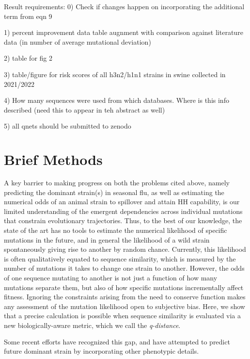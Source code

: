 \documentclass[onecolumn, compsoc,10pt]{IEEEtran}
\begin{document}
  {\color{magenta}
    Result requirements:
    0) Check if changes happen on incorporating the additional term from eqn 9
    
    1) percent improvement data table augnment with comparison against literature data (in number of average mutational deviation)
    
    2) table for fig 2
    
    3) table/figure for risk scores of all h3n2/h1n1 strains in swine collected in 2021/2022
    
    4) How many sequences were used from which databases. Where is this info described (need this to appear in teh abstract as well)
    
    5) all qnets should be submitted to zenodo
    }
 


    \section*{Brief Methods}
A key barrier to making progress  on both the problems cited above, namely predicting the dominant strain(s) in seasonal flu, as well as estimating the numerical odds of an animal strain  to spillover and attain HH capability,  is our limited understanding of the emergent dependencies across individual mutations that  constrain evolutionary trajectories. Thus, to the best of our knowledge, the state of the art has no tools to estimate the numerical likelihood of specific mutations in the future, and in general  the likelihood of a wild strain spontaneously giving rise to another by random chance. Currently, this likelihood is often qualitatively equated to sequence similarity, which is measured by the number of mutations it takes to change one strain to another. However, the odds of one sequence mutating to another is not just a function of how many mutations separate them, but also of how specific mutations incrementally affect fitness. Ignoring the constraints arising from the need to conserve function makes any assessment of the mutation likelihood open to subjective bias. Here, we show that a precise calculation is possible when sequence similarity is evaluated via a new biologically-aware metric, which we call the \textit{q-distance}.

Some recent efforts have recognized this gap, and have attempted to predict future dominant strain by incorporating other phenotypic details. 
\end{document}

